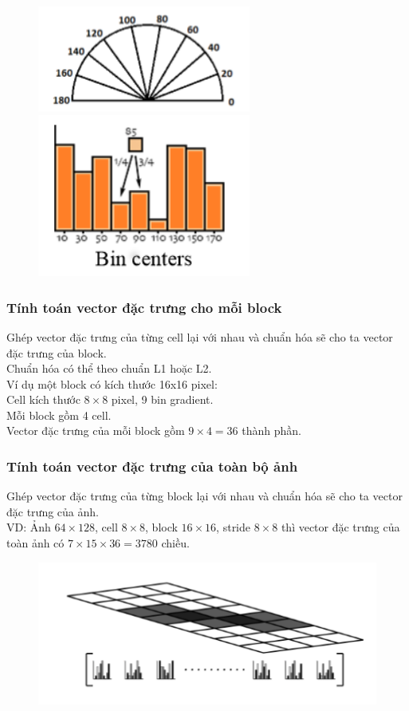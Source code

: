 \documentclass[../report.tex]{subfiles}
\begin{document}
\begin{figure}[H]
\centering
\includegraphics[width=7cm]{figures/bins-degree.png}
\includegraphics[width=7cm]{figures/bins.png}
\end{figure}

\subsubsection{Tính toán vector đặc trưng cho mỗi block}
Ghép vector đặc trưng của từng cell lại với nhau và 
chuẩn hóa sẽ cho ta vector đặc trưng của block. 
\\[3mm]
Chuẩn hóa có thể theo chuẩn L1 hoặc L2. 
\\[3mm]
Ví dụ một block có kích thước 16x16 pixel: \\
\tab Cell kích thước $8 \times 8$ pixel, 9 bin gradient. \\
\tab Mỗi block gồm 4 cell.  \\
\tab Vector đặc trưng của mỗi block gồm $9 \times 4 = 36$ thành phần.

\subsubsection{Tính toán vector đặc trưng của toàn bộ ảnh}
Ghép vector đặc trưng của từng block lại với nhau 
và chuẩn hóa sẽ cho ta vector đặc trưng của ảnh. 
\\[3mm]
VD: Ảnh $64 \times 128$, cell $8 \times 8$, 
block $16 \times 16$, stride $8 \times 8$ thì vector đặc trưng của toàn ảnh có 
$7 \times 15 \times 36=3780$ chiều. 
\begin{figure}[H]
\centering
\includegraphics[width=13cm]{figures/feature-vector.png}
\end{figure}
\end{document}
